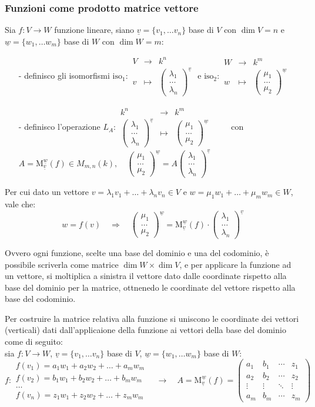 \documentclass[a4paper]{article}
\newcommand\f[4]{\begin{smallmatrix} {#1} &\to &{#2} \\ {#3} &\mapsto &{#4} \end{smallmatrix}}
\newcommand\m[2]{\text{M}_{\underline{#1}}^{\underline{#2}}}
\newcommand\psmatrix[3]{\left( \begin{smallmatrix} {#1} \\ {#2} \\ {#3} \end{smallmatrix} \right)}
\begin{document}
\subsubsection*{Funzioni come prodotto matrice vettore}
Sia \(f: V \to W\) funzione lineare, siano \(\underline{v} = \{ v_1, \dots v_n \}\) base di \(V\) con \(\dim V = n\) e
\(\underline{w} = \{ w_1, \dots w_m \}\) base di \(W\) con \(\dim W = m\):
\begin{itemize}
	\item[-] definisco gli isomorfismi \(\text{iso}_1: \f{V}{k^n}{v}{\psmatrix{\lambda_1}{\dots}{\lambda_n}^{\underline{v}}}\) e \(\text{iso}_2: \f{W}{k^m}{w}{\psmatrix{\mu_1}{\dots}{\mu_2}^{\underline{w}}}\)
	\item[-] definisco l'operazione \(L_A: \f{k^n}{k^m}{\psmatrix{\lambda_1}{\dots}{\lambda_n}^{\underline{v}}}{\psmatrix{\mu_1}{\dots}{\mu_2}^{\underline{w}}} \qquad \)
	con \(A = \m{v}{w}(f) \in M_{m,n}(k), \quad \psmatrix{\mu_1}{\dots}{\mu_2}^{\underline{w}} = A \psmatrix{\lambda_1}{\dots}{\lambda_n}^{\underline{v}}\)
\end{itemize}
Per cui dato un vettore \(v = \lambda_1 v_1 + \dots + \lambda_n v_n \in V\) e \(w = \mu_1 w_1 + \dots + \mu_m w_m \in W\),
vale che: \[w = f(v) \quad \Rightarrow \quad \psmatrix{\mu_1}{\dots}{\mu_2}^{\underline{w}} = \m{v}{w}(f) \cdot \psmatrix{\lambda_1}{\dots}{\lambda_n}^{\underline{v}}\]

Ovvero ogni funzione, scelte una base del dominio e una del codominio, è possibile scriverla come matrice \(\dim W \times \dim V\),
e per applicare la funzione ad un vettore, si moltiplica a sinistra il vettore dato dalle coordinate rispetto alla base del dominio
per la matrice, ottnenedo le coordinate del vettore rispetto alla base del codominio.

Per costruire la matrice relativa alla funzione si uniscono le coordinate dei vettori (verticali) dati dall'applicaione della funzione
ai vettori della base del dominio come di seguito: \\
sia \(f:V \to W\), \(\underline{v} = \{v_1, \dots v_n\}\) base di \(V\), \(\underline{w} = \{w_1, \dots w_m\}\) base di \(W\):
\[f: \begin{matrix}
	f(v_1) = a_1 w_1 + a_2 w_2 + \dots + a_m w_m \\
	f(v_2) = b_1 w_1 + b_2 w_2 + \dots + b_m w_m \\
	\dots \\
	f(v_n) = z_1 w_1 + z_2 w_2 + \dots + z_m w_m
\end{matrix} \quad \longrightarrow \quad A = \m{v}{w}(f) = \left( \begin{matrix}
	a_1 & b_1 & \cdots & z_1 \\
	a_2 & b_2 & \cdots & z_2 \\
	\vdots & \vdots & \ddots & \vdots \\
	a_m & b_m & \cdots & z_m
\end{matrix} \right)\]
\end{document}
